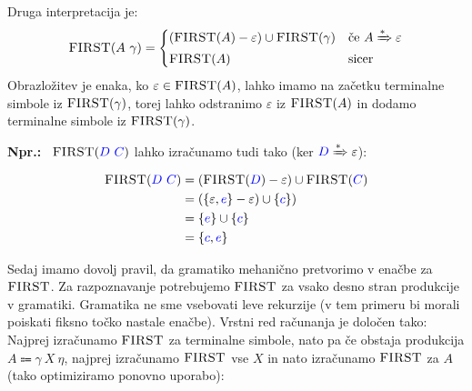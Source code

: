 \documentclass{article}
\newcommand{\Ex}{\textbf{Npr.:}\ }
\newcommand{\FIRST}{\textsc{FIRST}}
\newcommand{\Symbol}[1]{\textcolor{blue}{#1}}
\newcommand{\Null}{\varepsilon}
\newcommand{\Arrow}{\Coloneqq}
\newcommand{\DeriveStar}{\xRightarrow{\ast}}
\newcommand{\Seq}{\ }
\begin{document}
  Druga interpretacija je:
\begin{equation*}
  \FIRST(A \Seq \gamma) = \begin{cases}
    (\FIRST(A) - \Null) \cup \FIRST(\gamma) & \text{če } A \DeriveStar \Null \\
    \FIRST(A) & \text{sicer} \\
  \end{cases}
\end{equation*}
Obrazložitev je enaka, ko $\Null \in \FIRST(A)$, lahko imamo na začetku terminalne simbole iz $\FIRST(\gamma)$, torej lahko odstranimo $\Null$ iz $\FIRST(A)$ in dodamo terminalne simbole iz $\FIRST(\gamma)$.

\Ex
  $\FIRST(\Symbol{D} \Seq \Symbol{C})$ lahko izračunamo tudi tako (ker $\Symbol{D} \DeriveStar \Null$):
  \begin{equation*}
    \begin{aligned}
      \FIRST(\Symbol{D} \Seq \Symbol{C}) &= (\FIRST(\Symbol{D}) - \Null) \cup \FIRST(\Symbol{C})\\
                &= (\{\Null, \Symbol{e}\} - \Null) \cup \{\Symbol{c}\})\\
                &= \{\Symbol{e}\} \cup \{\Symbol{c}\}\\
                &= \{\Symbol{c}, \Symbol{e}\}
    \end{aligned}
  \end{equation*}

Sedaj imamo dovolj pravil, da gramatiko mehanično pretvorimo v enačbe za $\FIRST$.
Za razpoznavanje potrebujemo $\FIRST$ za vsako desno stran produkcije v gramatiki.
Gramatika ne sme vsebovati leve rekurzije (v tem primeru bi morali poiskati fiksno točko nastale enačbe).
Vrstni red računanja je določen tako: Najprej izračunamo $\FIRST$ za terminalne simbole, nato pa če obstaja produkcija ${A \Arrow \gamma \Seq X \Seq \eta}$, najprej izračunamo $\FIRST$ vse $X$ in nato izračunamo $\FIRST$ za $A$ (tako optimiziramo ponovno uporabo):
\end{document}
